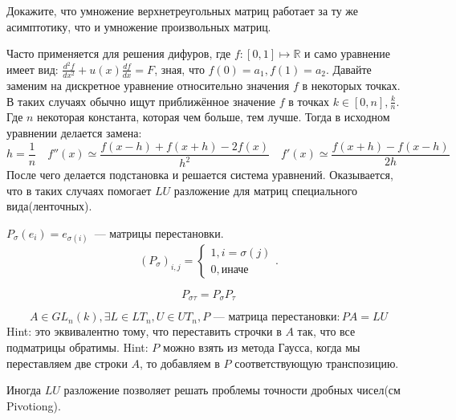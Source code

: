 \begin{task}
    Докажите, что умножение верхнетреугольных матриц работает за ту же асимптотику, что и умножение произвольных матриц.
\end{task}
\begin{example}
    Часто применяется для решения дифуров, где $f\colon [0, 1]\mapsto \mathbb{R}$ и само уравнение имеет вид:
    $\frac{d^2f}{dx^2} + u(x)\frac{df}{dx} = F$, зная, что $f(0) = a_1, f(1) = a_2$.
    Давайте заменим на дискретное уравнение относительно значения $f$ в некоторых точках. 
    В таких случаях обычно ищут приближённое значение $f$ в точках
    $k\in[0,n], \frac{k}{n}$. Где $n$ некоторая константа, которая чем больше, тем лучше.
    Тогда в исходном уравнении делается замена:
    \[
        h = \frac{1}{n}\quad
        f''(x)\simeq \frac{f(x-h)+f(x+h)-2f(x)}{h^2}\quad
        f'(x)\simeq \frac{f(x+h) - f(x - h)}{2h}
    \] 
    После чего делается подстановка и решается система уравнений.
    Оказывается, что в таких случаях помогает $LU$ разложение для матриц специального вида(ленточных).
\end{example}
\begin{example}
    $P_\sigma(e_i)= e_{\sigma(i)}$~--- матрицы перестановки.
     \[
         (P_\sigma)_{i,j} = \begin{cases}
             1, i = \sigma(j)\\
             0, \text{иначе}
         \end{cases}
    .\]
\end{example}
\begin{task}
    \[
        P_{\sigma\tau} = P_{\sigma} P_{\tau}
    \] 
\end{task}
\begin{task}
   \[
       A\in GL_n(k), \exists L\in LT_n, U\in UT_n, P\text{~--- матрица перестановки}\colon PA = LU
   \]  
   Hint: это эквивалентно тому, что переставить строчки в $A$ так, что все подматрицы обратимы.
   Hint: $P$ можно взять из метода Гаусса, когда мы переставляем две строки $A$, то добавляем в $P$ 
   соответствующую транспозицию.
\end{task}
\begin{remark}
    Иногда $LU$ разложение позволяет решать проблемы точности дробных чисел(см Pivotiong).
\end{remark}
